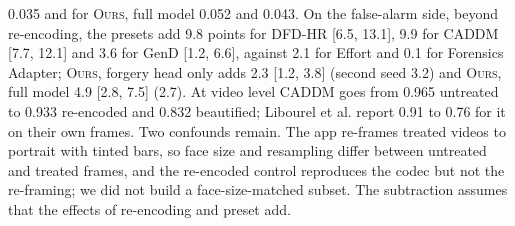 \documentclass[10pt]{article}
\newcommand{\oursB}{\textsc{Ours}, forgery head only}
\newcommand{\oursF}{\textsc{Ours}, full model}
\begin{document}
0.035 and for \oursF{} 0.052 and 0.043.
On the false-alarm side, beyond re-encoding, the presets add 9.8 points for DFD-HR [6.5, 13.1], 9.9 for CADDM [7.7, 12.1] and 3.6 for
GenD [1.2, 6.6], against 2.1 for Effort and 0.1 for Forensics Adapter; \oursB{} adds 2.3 [1.2, 3.8] (second seed 3.2) and
\oursF{} 4.9 [2.8, 7.5] (2.7). At video
level CADDM goes from 0.965 untreated to 0.933 re-encoded and 0.832 beautified; Libourel et al. report 0.91 to 0.76 for it on
their own frames. Two confounds remain. The app re-frames treated videos to portrait with tinted bars, so face size and
resampling differ between untreated and treated frames, and the re-encoded control reproduces the codec but not the re-framing;
we did not build a face-size-matched subset. The subtraction assumes that the effects of re-encoding and preset add.

\begin{table}[H]
\centering
\caption{The same videos, frames and per-video filter assignment with the filter applied to the face crop or to the full frame
before the crop (frame AUC). A filter with a vignette is centred on the face in the first case. The paper reports the full-frame
version.}
\label{tab:fullframe}
\footnotesize
\begin{adjustbox}{max width=\linewidth}\end{adjustbox}
\end{table}
\end{document}

